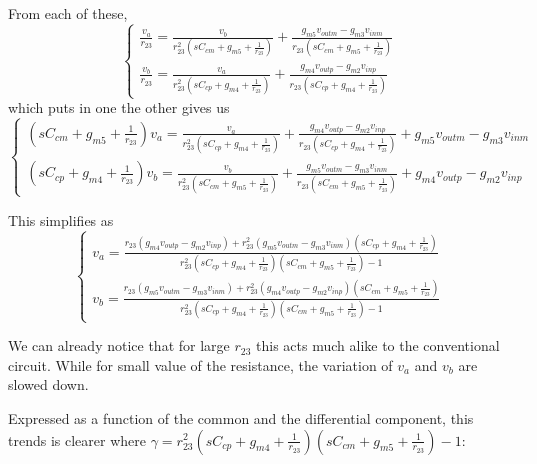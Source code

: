 From each of these, \[
\begin{cases}
    \frac{v_a}{r_{23}} = \frac{v_{b}}{r_{23}^2\left(sC_{cm}+g_{m5}+\frac{1}{r_{23}}\right)} + \frac{g_{m5}v_{outm} - g_{m3}v_{inm}}{r_{23}\left(sC_{cm}+g_{m5}+\frac{1}{r_{23}}\right)} \\
    \frac{v_b}{r_{23}} = \frac{v_{a}}{r_{23}^2\left(sC_{cp}+g_{m4}+\frac{1}{r_{23}}\right)} + \frac{g_{m4}v_{outp} - g_{m2}v_{inp}}{r_{23}\left(sC_{cp}+g_{m4}+\frac{1}{r_{23}}\right)}
\end{cases}
\]
which puts in one the other gives us \[
\begin{cases}
    \left(sC_{cm}+g_{m5}+\frac{1}{r_{23}}\right)v_a = \frac{v_{a}}{r_{23}^2\left(sC_{cp}+g_{m4}+\frac{1}{r_{23}}\right)} + \frac{g_{m4}v_{outp} - g_{m2}v_{inp}}{r_{23}\left(sC_{cp}+g_{m4}+\frac{1}{r_{23}}\right)} + g_{m5}v_{outm} - g_{m3}v_{inm}  \\
    \left(sC_{cp}+g_{m4}+\frac{1}{r_{23}}\right)v_b = \frac{v_{b}}{r_{23}^2\left(sC_{cm}+g_{m5}+\frac{1}{r_{23}}\right)} + \frac{g_{m5}v_{outm} - g_{m3}v_{inm}}{r_{23}\left(sC_{cm}+g_{m5}+\frac{1}{r_{23}}\right)} + g_{m4}v_{outp} - g_{m2}v_{inp}
\end{cases}
\]

This simplifies as \[
\begin{cases}
v_a = \frac{r_{23}\left(g_{m4}v_{outp}-g_{m2}v_{inp}\right)+r_{23}^2\left(g_{m5}v_{outm}-g_{m3}v_{inm}\right)\left(sC_{cp}+g_{m4}+\frac{1}{r_{23}}\right)}{r_{23}^2\left(sC_{cp}+g_{m4}+\frac{1}{r_{23}}\right)\left(sC_{cm}+g_{m5}+\frac{1}{r_{23}}\right)-1} \\
v_b = \frac{r_{23}\left(g_{m5}v_{outm}-g_{m3}v_{inm}\right)+r_{23}^2\left(g_{m4}v_{outp}-g_{m2}v_{inp}\right)\left(sC_{cm}+g_{m5}+\frac{1}{r_{23}}\right)}{r_{23}^2\left(sC_{cp}+g_{m4}+\frac{1}{r_{23}}\right)\left(sC_{cm}+g_{m5}+\frac{1}{r_{23}}\right)-1}
\end{cases}
\]

We can already notice that for large \(r_{23}\) this acts much alike to the conventional circuit. While for small value of the resistance, the variation of \(v_a\) and \(v_b\) are slowed down.

Expressed as a function of the common and the differential component, this trends is clearer where \(\gamma = r_{23}^2\left(sC_{cp}+g_{m4}+\frac{1}{r_{23}}\right)\left(sC_{cm}+g_{m5}+\frac{1}{r_{23}}\right)-1\):

